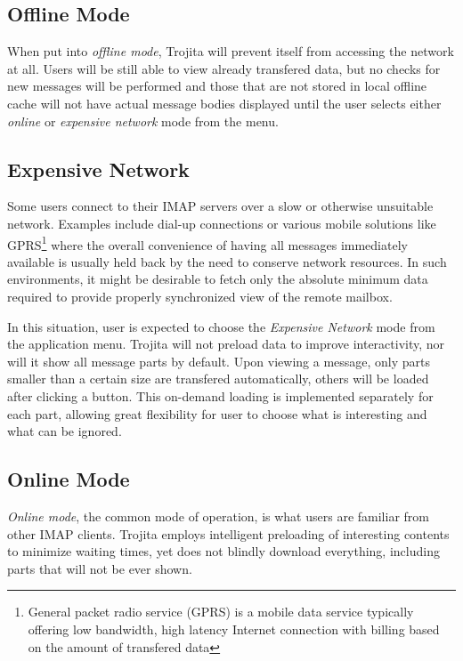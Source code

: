 \documentclass[12pt,notitlepage]{report}
\newcommand{\trojita}{Trojita\xspace}
\begin{document}
\subsection{Offline Mode}

When put into {\em offline mode}, \trojita will prevent itself from accessing
the network at all.  Users will be still able to view already transfered data, but
no checks for new messages will be performed and those that are not stored in
local offline cache will not have actual message bodies displayed until the user
selects either {\em online} or {\em expensive network} mode from the menu.

\subsection{Expensive Network}

Some users connect to their IMAP servers over a slow or otherwise unsuitable
network.  Examples include dial-up connections or various mobile solutions like
GPRS\footnote{General packet radio service (GPRS) is a mobile data service
typically offering low bandwidth, high latency Internet connection with billing
based on the amount of transfered data} where the overall convenience of having
all messages immediately available is usually held back by the need to conserve
network resources.  In such environments, it might be desirable to fetch only
the absolute minimum data required to provide properly synchronized view of the
remote mailbox.

In this situation, user is expected to choose the {\em Expensive Network} mode
from the application menu.  \trojita will not preload data to improve
interactivity, nor will it show all message parts by default.  Upon viewing a
message, only parts smaller than a certain size are transfered automatically,
others will be loaded after clicking a button.  This on-demand loading is
implemented separately for each part, allowing great flexibility for user to
choose what is interesting and what can be ignored.

\subsection{Online Mode}

{\em Online mode}, the common mode of operation, is what users are familiar from
other IMAP clients.  \trojita employs intelligent preloading of interesting
contents to minimize waiting times, yet does not blindly download everything,
including parts that will not be ever shown.
\end{document}
